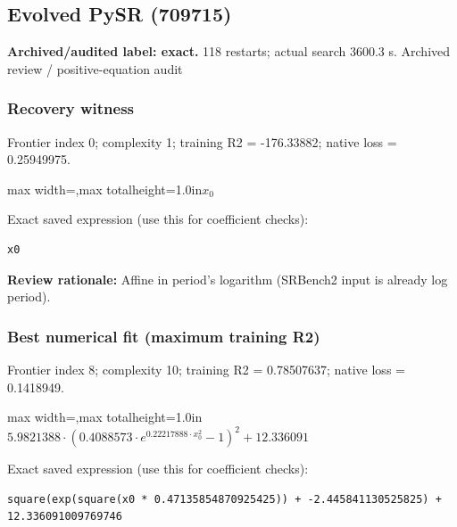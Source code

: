 \documentclass[10pt,letterpaper,landscape]{article}
\begin{document}
\begin{minipage}[t]{0.485\textwidth}
\subsection*{Evolved PySR (709715)}
\textbf{Archived/audited label: exact.} 118 restarts; actual search 3600.3 s.
{\small Archived review / positive-equation audit}
\subsubsection*{Recovery witness}
Frontier index 0; complexity 1; training R2 = -176.33882; native loss = 0.25949975.
\begin{center}\begin{adjustbox}{max width=\linewidth,max totalheight=1.0in}$\displaystyle x_{0}$\end{adjustbox}\end{center}
{\scriptsize Exact saved expression (use this for coefficient checks):}
\begin{lstlisting}
x0
\end{lstlisting}
{\small\textbf{Review rationale:} Affine in period's logarithm (SRBench2 input is already log period).}
\subsubsection*{Best numerical fit (maximum training R2)}
Frontier index 8; complexity 10; training R2 = 0.78507637; native loss = 0.1418949.
\begin{center}\begin{adjustbox}{max width=\linewidth,max totalheight=1.0in}$\displaystyle 5.9821388 \cdot \left(0.4088573 \cdot e^{0.22217888 \cdot x_{0}^{2}} - 1\right)^{2} + 12.336091$\end{adjustbox}\end{center}
{\scriptsize Exact saved expression (use this for coefficient checks):}
\begin{lstlisting}
square(exp(square(x0 * 0.47135854870925425)) + -2.445841130525825) + 12.336091009769746
\end{lstlisting}
\end{minipage}
\clearpage{}\label{leavitt-10006}
\end{document}

